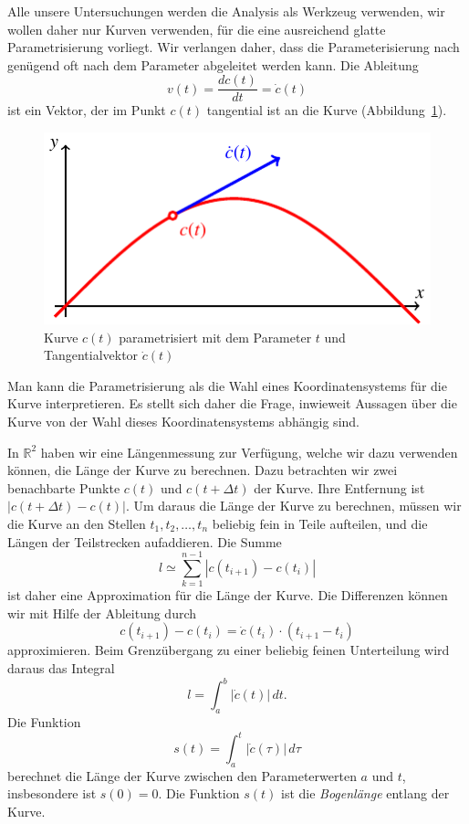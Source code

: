 Alle unsere Untersuchungen werden die Analysis als Werkzeug verwenden,
wir wollen daher nur Kurven verwenden, für die eine ausreichend glatte
Parametrisierung vorliegt.
Wir verlangen daher, dass die Parameterisierung nach genügend oft nach
dem Parameter abgeleitet werden kann.
Die Ableitung 
\[
v(t)
=
\frac{dc(t)}{dt}
=
\dot c(t)
\]
ist ein Vektor, der im Punkt $c(t)$ tangential ist an die Kurve 
(Abbildung~\ref{skript:kurve:tangente}).
\begin{figure}
\centering
\includegraphics{chapters/tikz/tangente.pdf}
\caption{Kurve $c(t)$ parametrisiert mit dem Parameter $t$ und Tangentialvektor
$\dot c(t)$
\label{skript:kurve:tangente}}
\end{figure}

Man kann die Parametrisierung als die Wahl eines Koordinatensystems
für die Kurve interpretieren.
Es stellt sich daher die Frage, inwieweit Aussagen über die Kurve von
der Wahl dieses Koordinatensystems abhängig sind.

In $\mathbb R^2$ haben wir eine Längenmessung zur Verfügung, welche
wir dazu verwenden können, die Länge der Kurve zu berechnen.
Dazu betrachten wir zwei benachbarte Punkte $c(t)$ und $c(t+\Delta t)$
der Kurve.
Ihre Entfernung ist $|c(t+\Delta t) - c(t)|$.
Um daraus die Länge der Kurve zu berechnen, müssen wir die Kurve
an den Stellen $t_1,t_2,\dots,t_n$
beliebig fein in Teile aufteilen, und die Längen der Teilstrecken
aufaddieren.
Die Summe
\[
l\simeq\sum_{k=1}^{n-1} |c(t_{i+1})-c(t_i)|
\]
ist daher eine Approximation für die Länge der Kurve.
Die Differenzen können wir mit Hilfe der Ableitung durch
\[
c(t_{i+1})-c(t_i) = \dot c(t_i)\cdot (t_{i+1}-t_i)
\]
approximieren.
Beim Grenzübergang zu einer beliebig feinen Unterteilung wird daraus
das Integral
\begin{equation}
l=\int_a^b |\dot c(t)|\,dt.
\end{equation}
Die Funktion
\begin{equation}
s(t)
=
\int_a^t |\dot c(\tau)|\,d\tau
\label{skript:kurve:s(t)}
\end{equation}
berechnet die Länge der Kurve zwischen den Parameterwerten
$a$ und $t$, insbesondere ist $s(0)=0$.
Die Funktion $s(t)$ ist die {\em Bogenlänge} entlang der Kurve.
%

